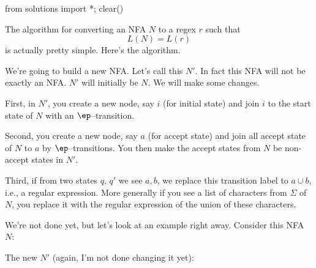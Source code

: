 \begin{python0}
from solutions import *; clear()
\end{python0}

The algorithm for converting an NFA $N$ to a regex $r$ such that
\[
L(N) = L(r)
\]
is actually pretty simple.
Here's the algorithm.

We're going to build a new NFA. 
Let's call this $N'$.
In fact this NFA will not be exactly an NFA.
$N'$ will initially be $N$.
We will make some changes.

First, in $N'$, 
you create a new node, say $i$ (for initial state) and join $i$ to 
the start state of $N$ with an $\ep$--transition.

Second, 
you create a new node, say $a$ (for accept state) and join 
all accept state of $N$ to $a$ by $\ep$--transitions.
You then make the accept states from $N$ be non-accept states in $N'$.

Third,
if from two states $q$, $q'$ we see $a,b$, we
replace this transition label to $a \cup b$, i.e., a regular expression.
More generally if you see a list of characters from $\Sigma$ of $N$,
you replace it with the regular expression of the union of these characters.

We're not done yet, but let's look at an example right away.
Consider this NFA $N$:
\begin{center}
\end{center}
The new $N'$ (again, I'm not done changing it yet):
\begin{center}
\end{center}

